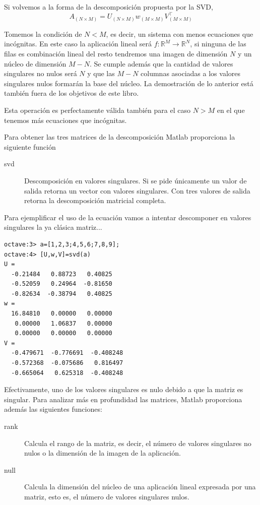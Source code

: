 Si volvemos a la forma de la descomposición propuesta por la SVD,
$$
A_{(N\times M)}=U_{(N\times M)}w_{(M\times M)}V_{(M\times M)}^{\top}$$

Tomemos la condición de $N<M$, es decir, un sistema con menos
ecuaciones que incógnitas. En este caso la aplicación lineal será
$f:\mathbb{R}^{M}\longrightarrow\mathbb{R}^{N}$, si ninguna de las
filas es combinación lineal del resto tendremos una imagen de
dimensión $N$ y un núcleo de dimensión $M-N$. Se cumple además que la
cantidad de valores singulares no nulos será $N$ y que las $M-N$
columnas asociadas a los valores singulares nulos formarán la base del
núcleo. La demostración de lo anterior está también fuera de los
objetivos de este libro.

Esta operación es perfectamente válida también para el caso $N>M$ en
el que tenemos más ecuaciones que incógnitas.

Para obtener las tres matrices de la descomposición Matlab proporciona
la siguiente función

\begin{description}
\item [svd]Descomposición en valores singulares. Si se pide
  únicamente un valor de salida retorna un vector con valores
  singulares.  Con tres valores de salida retorna la descomposición
  matricial completa.
\end{description}
Para ejemplificar el uso de la ecuación vamos a intentar descomponer
en valores singulares la ya clásica matriz...

  \begin{verbatim}
octave:3> a=[1,2,3;4,5,6;7,8,9];
octave:4> [U,w,V]=svd(a)
U =
  -0.21484   0.88723   0.40825
  -0.52059   0.24964  -0.81650
  -0.82634  -0.38794   0.40825
w =
  16.84810   0.00000   0.00000
   0.00000   1.06837   0.00000
   0.00000   0.00000   0.00000
V =
  -0.479671  -0.776691  -0.408248
  -0.572368  -0.075686   0.816497
  -0.665064   0.625318  -0.408248
\end{verbatim}
Efectivamente, uno de los valores singulares es nulo debido a que la
matriz es singular. Para analizar más en profundidad las matrices,
Matlab proporciona además las siguientes funciones:

\begin{description}
\item [rank]Calcula el rango de la matriz, es decir, el
  número de valores singulares no nulos o la dimensión de la imagen de
  la aplicación.
\item [null]Calcula la dimensión del núcleo de una
  aplicación lineal expresada por una matriz, esto es, el número de
  valores singulares nulos.
\end{description}


